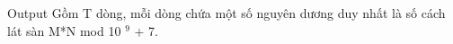 Output
Gồm T dòng, mỗi dòng chứa một số nguyên dương duy nhất là số cách lát sàn M*N mod 10   $^    9   $   + 7.